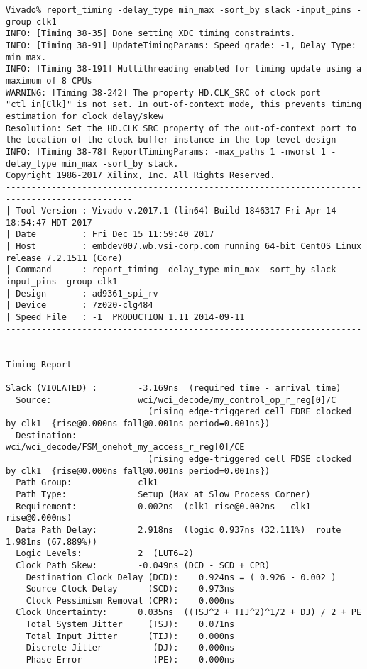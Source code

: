 \documentclass{article}
\begin{document}
\begin{lstlisting}
Vivado% report_timing -delay_type min_max -sort_by slack -input_pins -group clk1
INFO: [Timing 38-35] Done setting XDC timing constraints.
INFO: [Timing 38-91] UpdateTimingParams: Speed grade: -1, Delay Type: min_max.
INFO: [Timing 38-191] Multithreading enabled for timing update using a maximum of 8 CPUs
WARNING: [Timing 38-242] The property HD.CLK_SRC of clock port "ctl_in[Clk]" is not set. In out-of-context mode, this prevents timing estimation for clock delay/skew
Resolution: Set the HD.CLK_SRC property of the out-of-context port to the location of the clock buffer instance in the top-level design
INFO: [Timing 38-78] ReportTimingParams: -max_paths 1 -nworst 1 -delay_type min_max -sort_by slack.
Copyright 1986-2017 Xilinx, Inc. All Rights Reserved.
-----------------------------------------------------------------------------------------------
| Tool Version : Vivado v.2017.1 (lin64) Build 1846317 Fri Apr 14 18:54:47 MDT 2017
| Date         : Fri Dec 15 11:59:40 2017
| Host         : embdev007.wb.vsi-corp.com running 64-bit CentOS Linux release 7.2.1511 (Core)
| Command      : report_timing -delay_type min_max -sort_by slack -input_pins -group clk1
| Design       : ad9361_spi_rv
| Device       : 7z020-clg484
| Speed File   : -1  PRODUCTION 1.11 2014-09-11
-----------------------------------------------------------------------------------------------

Timing Report

Slack (VIOLATED) :        -3.169ns  (required time - arrival time)
  Source:                 wci/wci_decode/my_control_op_r_reg[0]/C
                            (rising edge-triggered cell FDRE clocked by clk1  {rise@0.000ns fall@0.001ns period=0.001ns})
  Destination:            wci/wci_decode/FSM_onehot_my_access_r_reg[0]/CE
                            (rising edge-triggered cell FDSE clocked by clk1  {rise@0.000ns fall@0.001ns period=0.001ns})
  Path Group:             clk1
  Path Type:              Setup (Max at Slow Process Corner)
  Requirement:            0.002ns  (clk1 rise@0.002ns - clk1 rise@0.000ns)
  Data Path Delay:        2.918ns  (logic 0.937ns (32.111%)  route 1.981ns (67.889%))
  Logic Levels:           2  (LUT6=2)
  Clock Path Skew:        -0.049ns (DCD - SCD + CPR)
    Destination Clock Delay (DCD):    0.924ns = ( 0.926 - 0.002 ) 
    Source Clock Delay      (SCD):    0.973ns
    Clock Pessimism Removal (CPR):    0.000ns
  Clock Uncertainty:      0.035ns  ((TSJ^2 + TIJ^2)^1/2 + DJ) / 2 + PE
    Total System Jitter     (TSJ):    0.071ns
    Total Input Jitter      (TIJ):    0.000ns
    Discrete Jitter          (DJ):    0.000ns
    Phase Error              (PE):    0.000ns


\end{lstlisting}
\end{document}
